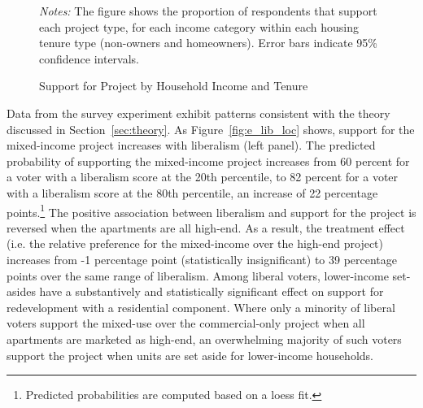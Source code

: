 \documentclass[article,11pt]{memoir}
\begin{document}

\begin{figure}[tb]\centering
  \caption{Support for Project by Household Income and Tenure}
  \label{fig:e_income_tenure}
  \begin{measuredfigure}
  \end{measuredfigure}
  \begin{tablenotes}[flushleft]
    \item \hspace{-.2em}\emph{Notes:} The figure shows the proportion of respondents that support each project type, for each income category within each housing tenure type (non-owners and homeowners). Error bars indicate 95\% confidence intervals.
  \end{tablenotes}
\end{figure}


Data from the survey experiment exhibit patterns consistent with the theory discussed in Section~\ref{sec:theory}.  As Figure~\ref{fig:e_lib_loc} shows, support for the mixed-income project increases with liberalism (left panel). The predicted probability of supporting the mixed-income project increases from 60 percent for a voter with a liberalism score at the 20th percentile, to 82 percent for a voter with a liberalism score at the 80th percentile, an increase of 22 percentage points.\footnote{Predicted probabilities are computed based on a loess fit.}  The positive association between liberalism and support for the  project is reversed when the apartments are all high-end.  As a result, the treatment effect (i.e. the relative preference for the mixed-income over the high-end project) increases from -1 percentage point (statistically insignificant) to 39 percentage points over the same range of liberalism. Among liberal voters, lower-income set-asides have a substantively and statistically significant effect on support for redevelopment with a residential component. Where only a minority of liberal voters support the mixed-use over the commercial-only project when all apartments are marketed as high-end, an overwhelming majority of such voters support the project when units are set aside for lower-income households.
\end{document}
